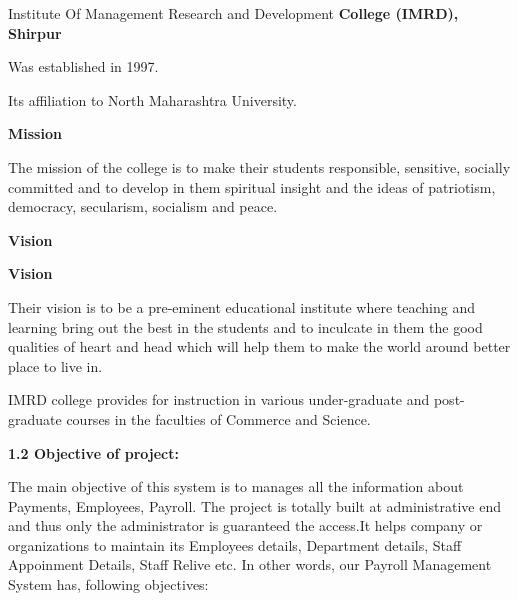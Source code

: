 \documentclass{article} %
\begin{document}
\noindent \textbf{}

\noindent \textbf{}

\noindent \textbf{}

\noindent \textbf{}

\noindent \textbf{   }

\noindent \textbf{}

\noindent \textbf{}

\noindent \textbf{}

\noindent \textbf{                               }\underbar{}

\noindent 

\noindent Institute Of Management Research and Development\textbf{ College (IMRD), Shirpur}

\noindent Was\textbf{ }established in 1997. \textbf{}

\noindent Its affiliation to North Maharashtra University. 

\noindent \textbf{Mission }

\noindent The mission of the college is to make their students responsible, sensitive, socially committed and to develop in them spiritual insight and the ideas of patriotism, democracy, secularism, socialism and peace. 

\noindent \textbf{Vision }

\noindent \textbf{Vision }

\noindent Their vision is to be a pre-eminent educational institute where teaching and learning bring out the best in the students and to inculcate in them the good qualities of heart and head which will help them to make the world around better place to live in. 

\noindent IMRD  college provides for instruction in various under-graduate and post-graduate courses in the faculties of Commerce and Science. 

\noindent \textbf{1.2 Objective of project: }

\noindent 

\noindent The main objective of this system is to manages all the information about Payments, Employees, Payroll. The project is totally built at administrative end and thus only the administrator is guaranteed the access.It helps company or organizations to maintain its Employees details, Department details, Staff Appoinment Details, Staff Relive etc. In other words, our Payroll Management System has, following objectives:

\noindent 
\end{document}
